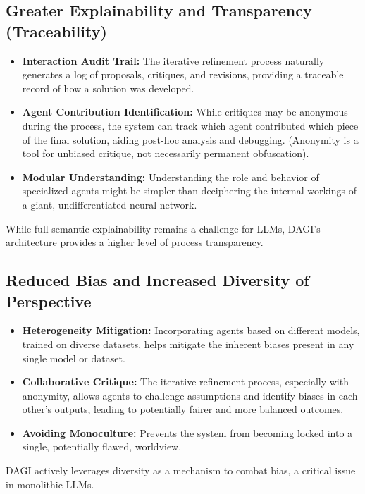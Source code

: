 \documentclass[12pt]{amsart}
\begin{document}
\subsection{Greater Explainability and Transparency (Traceability)}
\begin{itemize}[leftmargin=*]
    \item \textbf{Interaction Audit Trail:} The iterative refinement process naturally generates a log of proposals, critiques, and revisions, providing a traceable record of how a solution was developed.
    \item \textbf{Agent Contribution Identification:} While critiques may be anonymous during the process, the system can track which agent contributed which piece of the final solution, aiding post-hoc analysis and debugging. (Anonymity is a tool for unbiased critique, not necessarily permanent obfuscation).
    \item \textbf{Modular Understanding:} Understanding the role and behavior of specialized agents might be simpler than deciphering the internal workings of a giant, undifferentiated neural network.
\end{itemize}
While full semantic explainability remains a challenge for LLMs, DAGI's architecture provides a higher level of process transparency.

\subsection{Reduced Bias and Increased Diversity of Perspective}
\begin{itemize}[leftmargin=*]
    \item \textbf{Heterogeneity Mitigation:} Incorporating agents based on different models, trained on diverse datasets, helps mitigate the inherent biases present in any single model or dataset.
    \item \textbf{Collaborative Critique:} The iterative refinement process, especially with anonymity, allows agents to challenge assumptions and identify biases in each other's outputs, leading to potentially fairer and more balanced outcomes.
    \item \textbf{Avoiding Monoculture:} Prevents the system from becoming locked into a single, potentially flawed, worldview.
\end{itemize}
DAGI actively leverages diversity as a mechanism to combat bias, a critical issue in monolithic LLMs.
\end{document}
